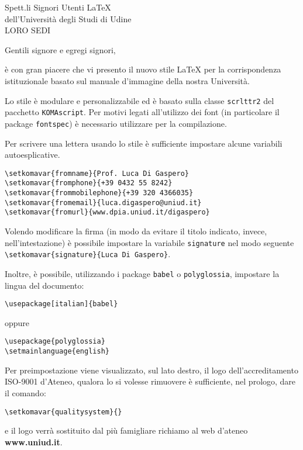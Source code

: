 \documentclass[dpia,subject=true]{scrlttr2}
\begin{document}
  \begin{letter}{Spett.li Signori Utenti \LaTeX \\
    dell'Università degli Studi di Udine \\
    \MakeUppercase{Loro Sedi}
    }
    \opening{Gentili signore e egregi signori,}

è con gran piacere che vi presento il nuovo stile \LaTeX{} per la corrispondenza istituzionale basato sul manuale d'immagine della nostra Università.

    Lo stile è modulare e personalizzabile ed è basato sulla classe \texttt{scrlttr2} del pacchetto \texttt{KOMAscript}. Per motivi legati all'utilizzo dei font (in particolare il package \texttt{fontspec}) è necessario utilizzare \XeLaTeX{} per la compilazione.
    
    Per scrivere una lettera usando lo stile è sufficiente impostare alcune variabili autoesplicative.
\begin{lstlisting}
\setkomavar{fromname}{Prof. Luca Di Gaspero}
\setkomavar{fromphone}{+39 0432 55 8242}
\setkomavar{frommobilephone}{+39 320 4366035}
\setkomavar{fromemail}{luca.digaspero@uniud.it}
\setkomavar{fromurl}{www.dpia.uniud.it/digaspero}
\end{lstlisting}

    Volendo modificare la firma (in modo da evitare il titolo indicato, invece, nell'intestazione) è possibile impostare la variabile \texttt{signature} nel modo seguente \lstinline|\setkomavar{signature}{Luca Di Gaspero}|.

    Inoltre, è possibile, utilizzando i package \texttt{babel} o \texttt{polyglossia}, impostare la lingua del documento:
\begin{lstlisting}
\usepackage[italian]{babel}  
\end{lstlisting}
    oppure
\begin{lstlisting}
\usepackage{polyglossia}
\setmainlanguage{english}
\end{lstlisting}    

    Per preimpostazione viene visualizzato, sul lato destro, il logo dell'accreditamento ISO-9001 d'Ateneo, qualora lo si volesse rimuovere è sufficiente, nel prologo, dare il comando:
\begin{lstlisting}
\setkomavar{qualitysystem}{}
\end{lstlisting}
  e il logo verrà sostituito dal più famigliare richiamo al web d'ateneo \textbf{www.uniud.it}.


\end{letter}
\end{document}
